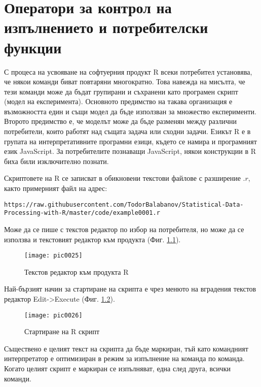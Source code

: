 ﻿\newpage
\chapter{Оператори за контрол на изпълнението и потребителски функции}
\label{chapter05}
\thispagestyle{empty}

С процеса на усвояване на софтуерния продукт R всеки потребител установява, че някои команди биват повтаряни многократно. Това навежда на мисълта, че тези команди може да бъдат групирани и съхранени като програмен скрипт (модел на експеримента). Основното предимство на такава организация е възможността един и същи модел да бъде използван за множество експерименти. Второто предимство е, че моделът може да бъде разменян между различни потребители, които работят над същата задача или сходни задачи. Езикът R е в групата на интерпретативните програмни езици, където се намира и програмният език JavaScript. За потребителите познаващи JavaScript, някои конструкции в R биха били изключително познати.

Скриптовете на R се записват в обикновени текстови файлове с разширение $.r$, както примерният файл на адрес:

\begin{lstlisting}[caption=Адрес на примерен R скрипт, label=listing0074]
https://raw.githubusercontent.com/TodorBalabanov/Statistical-Data-Processing-with-R/master/code/example0001.r
\end{lstlisting}

Може да се пише с текстов редактор по избор на потребителя, но може да се използва и текстовият редактор към продукта (Фиг. \ref{figure0025}).

\begin{figure}[h!]
  \centering
  \texttt{[image: pic0025]}
  \caption{Текстов редактор към продукта R}
\label{figure0025}
\end{figure}
\FloatBarrier

Най-бързият начин за стартиране на скрипта е чрез менюто на вградения текстов редактор Edit->Execute (Фиг. \ref{figure0026}).

\begin{figure}[h!]
  \centering
  \texttt{[image: pic0026]}
  \caption{Стартиране на R скрипт}
\label{figure0026}
\end{figure}
\FloatBarrier

Съществено е целият текст на скрипта да бъде маркиран, тъй като командният интерпретатор е оптимизиран в режим за изпълнение на команда по команда. Когато целият скрипт е маркиран се изпълняват, една след друга, всички команди.

